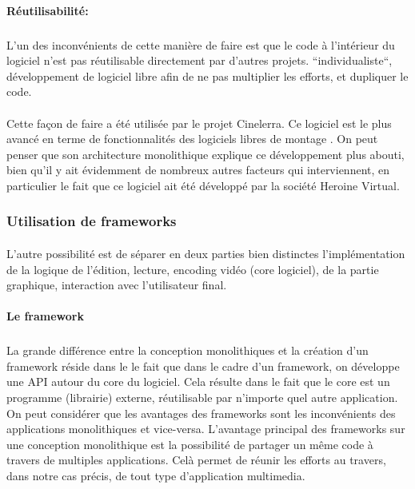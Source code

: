 \paragraph{Réutilisabilité:}

\subparagraph { }

L'un des inconvénients de cette manière de faire est que le code %
 à l'intérieur du logiciel n'est pas réutilisable directement
par d'autres projets. %
``individualiste``, %
développement de logiciel libre afin de ne pas multiplier les efforts,
et dupliquer le code.

\paragraph{}

Cette façon de faire a été utilisée par le projet Cinelerra. Ce
logiciel est le plus avancé en terme de fonctionnalités %
des logiciels libres de montage . On peut penser que son
architecture monolithique explique ce développement
plus abouti, bien qu'il y ait évidemment de nombreux autres facteurs qui
interviennent, en particulier le fait que ce logiciel ait été développé
par la société Heroine Virtual.

\subsubsection {Utilisation de  frameworks }

\paragraph{}

L'autre possibilité est de séparer en deux parties bien distinctes
l'implémentation de la logique de l'édition, lecture, encoding vidéo
(core logiciel), de la partie graphique, interaction avec l'utilisateur
final.

\paragraph {Le framework}

\subparagraph{}

La grande différence entre la conception monolithiques
 et la création d'un framework 
réside dans le le fait que dans le cadre d'un framework, on développe
une API  autour du core du logiciel. Cela résulte dans le
fait que le core est un programme (librairie) externe, réutilisable par
n'importe quel autre application.  On peut considérer que les avantages
des frameworks sont les inconvénients des applications monolithiques
 et vice-versa. L'avantage principal des frameworks
sur une conception monolithique est la possibilité
de partager un même code à travers de multiples applications. Celà
permet de réunir les efforts au travers, dans notre cas précis, de
tout type d'application multimedia.

